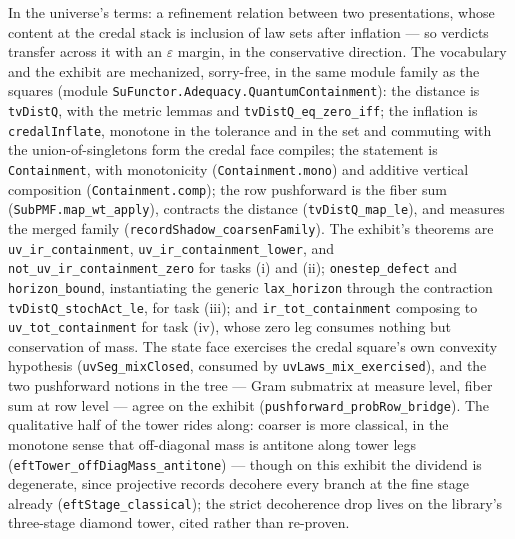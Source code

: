 In the universe's terms: a refinement relation between two
presentations, whose content at the credal stack is inclusion of law
sets after inflation --- so verdicts transfer across it with an
$\varepsilon$ margin, in the conservative direction. The vocabulary
and the exhibit are mechanized, sorry-free, in the same module
family as the squares (module
\texttt{SuFunctor.Adequacy.QuantumContainment}): the distance is
\texttt{tvDistQ}, with the metric lemmas and
\texttt{tvDistQ\_eq\_zero\_iff}; the inflation is
\texttt{credalInflate}, monotone in the tolerance and in the set and
commuting with the union-of-singletons form the credal face
compiles; the statement is \texttt{Containment}, with monotonicity
(\texttt{Containment.mono}) and additive vertical composition
(\texttt{Containment.comp}); the row pushforward is the fiber sum
(\texttt{SubPMF.map\_wt\_apply}), contracts the distance
(\texttt{tvDistQ\_map\_le}), and measures the merged family
(\texttt{recordShadow\_coarsenFamily}). The exhibit's theorems are
\texttt{uv\_ir\_containment}, \texttt{uv\_ir\_containment\_lower},
and \texttt{not\_uv\_ir\_containment\_zero} for tasks (i) and (ii);
\texttt{onestep\_defect} and \texttt{horizon\_bound}, instantiating
the generic \texttt{lax\_horizon} through the contraction
\texttt{tvDistQ\_stochAct\_le}, for task (iii); and
\texttt{ir\_tot\_containment} composing to
\texttt{uv\_tot\_containment} for task (iv), whose zero leg consumes
nothing but conservation of mass. The state face exercises the
credal square's own convexity hypothesis (\texttt{uvSeg\_mixClosed},
consumed by \texttt{uvLaws\_mix\_exercised}), and the two
pushforward notions in the tree --- Gram submatrix at measure level,
fiber sum at row level --- agree on the exhibit
(\texttt{pushforward\_probRow\_bridge}). The qualitative half of the
tower rides along: coarser is more classical, in the monotone sense
that off-diagonal mass is antitone along tower legs
(\texttt{eftTower\_offDiagMass\_antitone}) --- though on this
exhibit the dividend is degenerate, since projective records
decohere every branch at the fine stage already
(\texttt{eftStage\_classical}); the strict decoherence drop lives on
the library's three-stage diamond tower, cited rather than
re-proven.

